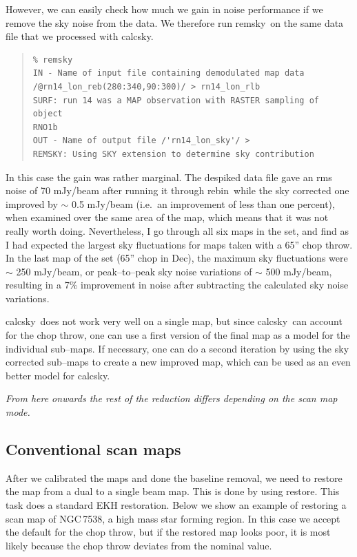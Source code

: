 \documentclass[twoside,11pt]{article}
\newenvironment{myquote}{\begin{quote}\begin{small}}{\end{small}\end{quote}}
\newcommand{\task}[1]{\textsf{#1}}
\newcommand{\rebin}{\xref{\task{rebin}}{sun216}{REBIN}}
\newcommand{\calcsky}{\xref{\task{calcsky}}{sun216}{CALCSKY}}
\newcommand{\remsky}{\xref{\task{remsky}}{sun216}{REMSKY}}
\newcommand{\restore}{\xref{\task{restore}}{sun216}{RESTORE}}
\newcommand{\xref}[3]{#1}
\newcommand{\xlabel}[1]{}
\renewcommand{\_}{\texttt{\symbol{95}}}
\begin{document}
However, we can easily check how much we gain in noise performance if
we remove the sky noise from the data.  We therefore run \remsky\ on
the same data file that we processed with \calcsky.

\begin{myquote}
\begin{verbatim}
% remsky
IN - Name of input file containing demodulated map data 
/@rn14_lon_reb(280:340,90:300)/ > rn14_lon_rlb
SURF: run 14 was a MAP observation with RASTER sampling of object 
RNO1b
OUT - Name of output file /'rn14_lon_sky'/ > 
REMSKY: Using SKY extension to determine sky contribution
\end{verbatim}
\end{myquote}

In this case the gain was rather marginal. The despiked data file gave
an rms noise of 70 mJy/beam after running it through \rebin\, while the
sky corrected one improved by $\sim$ 0.5 mJy/beam (i.e.\ an improvement
of less than one percent), when examined over the same area of the map,
which means that it was not really worth doing. Nevertheless, I go
through all six maps in the set, and find as I had expected the largest
sky fluctuations for maps taken with a 65'' chop throw. In the last map
of the set (65'' chop in Dec), the maximum sky fluctuations were $\sim$
250 mJy/beam, or  peak--to--peak sky noise variations of $\sim$ 500
mJy/beam, resulting in a 7\% improvement in noise after subtracting the
calculated sky noise variations.

\calcsky\ does not work very well on a single map, but since \calcsky\
can account for the chop throw, one can use a first version of the
final map as a model for the individual sub--maps.  If necessary, one
can do a second iteration by using the sky corrected sub--maps to
create a new improved map, which can be used as an even better model
for \calcsky.

{\it From here onwards the rest of the reduction differs depending on
the scan map mode.}

\subsection{\xlabel{Conventional_scan_maps}Conventional scan maps}

After we calibrated the maps and done the baseline removal, we need to
restore the map from a dual to a single beam map.  This is done by
using \restore.  This task does a standard EKH restoration.  Below we
show an example of restoring a scan map of NGC\,7538, a high mass star
forming region.  In this case we accept the default for the chop
throw, but if the restored map looks poor, it is most likely because
the chop throw deviates from the nominal value.
\end{document}
